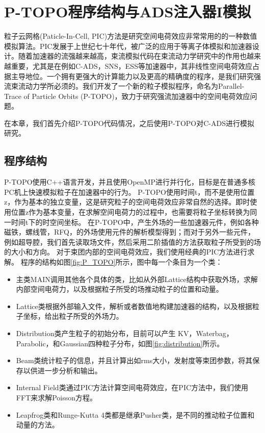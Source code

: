 
\chapter{P-TOPO程序结构与ADS注入器I模拟}
\label{chap:PTOPO_ADS}

粒子云网格(Paticle-In-Cell, PIC)方法是研究空间电荷效应非常常用的的一种数值模拟算法\cite{PIC_birdsall2004plasma,PIC_luccio2002space}。PIC发展于上世纪七十年代，被广泛的应用于等离子体模拟和加速器设计。随着加速器的流强越来越高，束流模拟代码在束流动力学研究中的作用也越来越重要，尤其是在例如C-ADS，SNS，ESS等加速器中\cite{li2013physics,henderson2014spallation,eshraqi2016ess}，其非线性空间电荷效应占据主导地位。一个拥有更强大的计算能力以及更高的精确度的程序，是我们研究强流束流动力学所必须的。我们开发了一个新的粒子模拟程序，命名为Parallel-Trace of Particle Orbits (P-TOPO)，致力于研究强流加速器中的空间电荷效应问题\cite{li2016nonlinear,li2014envelope,li16collective,li2015space}。

在本章，我们首先介绍P-TOPO代码情况，之后使用P-TOPO对C-ADS进行模拟研究。

\section{程序结构}
P-TOPO使用C++语言开发，并且使用OpenMP进行并行化，目标是在普通多核PC机上快速模拟粒子在加速器中的行为。
P-TOPO使用时间t，而不是使用位置z，作为基本的独立变量，这是研究粒子的空间电荷效应非常自然的选择。即时使用位置z作为基本变量，在求解空间电荷力的过程中，也需要将粒子坐标转换为同一时间t下的时空间坐标。
在P-TOPO中，产生外场的一些加速器元件，例如各种磁铁，螺线管，RFQ，的外场使用元件的解析模型得到；而对于另外一些元件，例如超导腔，我们首先读取场文件\cite{studio2008cst}，然后采用二阶插值的方法获取粒子所受到的场的大小和方向。
对于束团内部的空间电荷效应，我们使用经典的PIC方法进行求解\cite{hockney1988computer}。
程序的结构如图\ref{fig:P_TOPO}所示，图中每一个条目为一个类：
\begin{itemize}
  \item 主类MAIN调用其他各个具体的类，比如从外部Lattice结构中获取外场，求解内部空间电荷力，以及根据粒子所受的场推动粒子的位置和动量。
  \item Lattice类根据外部输入文件，解析或者数值地构建加速器的结构，以及根据粒子坐标，给出粒子所受的外场力。
  \item Distribution类产生粒子的初始分布，目前可以产生 KV，Waterbag，Parabolic，和Gaussian四种粒子分布，如图\ref{fig:distribution}所示。
  \item Beam类统计粒子的信息，并且计算出如rms大小，发射度等束团参数，将其保存以供进一步分析和输出。
  \item Internal Field类通过PIC方法计算空间电荷效应，在PIC方法中，我们使用FFT来求解Poisson方程。
  \item Leapfrog类和Runge-Kutta 4类都是继承Pusher类，是不同的推动粒子位置和动量的方法。
\end{itemize}


